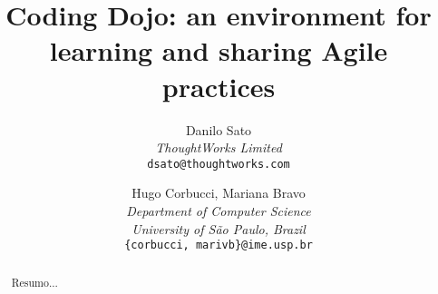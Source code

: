 \documentclass[times, 10pt,twocolumn]{article}
\begin{document}
\title{Coding Dojo: an environment for learning and sharing Agile practices}

\author{Danilo Sato\\
\textit{ThoughtWorks Limited}\\ 
{\tt dsato@thoughtworks.com}\\
\and
Hugo Corbucci, Mariana Bravo\\
\textit{Department of Computer Science}\\
\textit{University of São Paulo, Brazil}\\
{\tt \{corbucci, marivb\}@ime.usp.br}
}

\maketitle
\thispagestyle{empty}

\begin{abstract}
   Resumo... 
\end{abstract}









\end{document}
